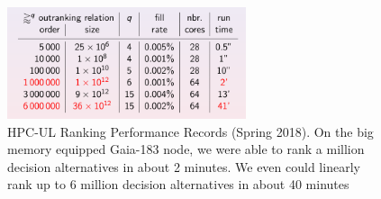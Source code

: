\begin{figure}[ht]
\sidecaption
\includegraphics[width=7cm]{Figures/11-2-rankingRecords.png}
\caption{HPC-UL Ranking Performance Records (Spring 2018). On the big memory equipped Gaia-183 node, we were able to rank a million decision alternatives in about 2 minutes. We even could linearly rank up to 6 million decision alternatives in about 40 minutes}
\label{fig:11.2}       %
\end{figure}
  
%


